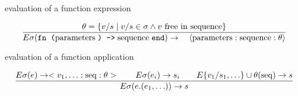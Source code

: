 \begin{frame}[fragile]{evaluation of a function expression}

$$\frac{ \theta = \{ v/s \mid  v/s \in \sigma \wedge v {\rm\ free\  in\ sequence}\}}{
E\sigma(\texttt{fn (} {\rm parameters}\;  \texttt{) ->}\; {\rm sequence}\; \texttt{end} ) \rightarrow \quad \langle{\rm parameters}:{\rm sequence}:\theta\rangle}$$

\end{frame}


\begin{frame}[fragile]{evaluation of a function application}

$$\frac{E\sigma(e) \rightarrow <v_1, \ldots:{\rm seq}:\theta > \qquad E\sigma(e_i) \rightarrow s_i \qquad E\{v_1/s_1, \ldots\}\cup\theta({\rm seq}) \rightarrow s}{
E\sigma(e.(e_1, \ldots)) \rightarrow s}$$ 


\end{frame}





